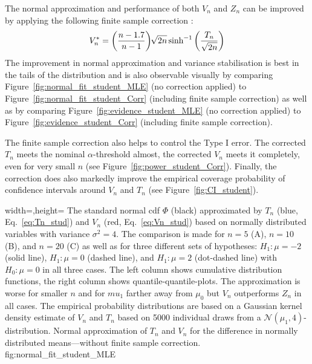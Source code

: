 The normal approximation and performance of both $V_n$ and $Z_n$ can be improved by applying the following finite sample correction \citep[p.~161]{kulinskaya_meta_2008}:
\begin{align}
    V_n^* = \left(\frac{n-1.7}{n-1}\right) \sqrt[]{2n}\,\text{sinh}^{-1}\left(\frac{T_n}{\sqrt{2n}}\right) \label{eq:finite_sample_correction}
\end{align} %
The improvement in normal approximation and variance stabilisation is best in the tails of the distribution and is also observable visually by comparing Figure~\ref{fig:normal_fit_student_MLE} (no correction applied) to Figure~\ref{fig:normal_fit_student_Corr} (including finite sample correction) as well as by comparing Figure~\ref{fig:evidence_student_MLE} (no correction applied) to Figure~\ref{fig:evidence_student_Corr} (including finite sample correction).\par
The finite sample correction also helps to control the Type I error. The corrected $T_n$ meets the nominal $\alpha$-threshold almost, the corrected $V_n$ meets it completely, even for very small $n$ (see Figure~\ref{fig:power_student_Corr}). Finally, the correction does also markedly improve the empirical coverage probability of confidence intervals around $V_n$ and $T_n$ (see Figure~\ref{fig:CI_student}).


  {width=\textwidth,height=\textheight}%
  {The standard normal cdf $\Phi$ (black) approximated by $T_n$ (blue, Eq.~\ref{eq:Tn_stud}) and $V_n$ (red, Eq.~\ref{eq:Vn_stud}) based on normally distributed variables with variance ${\sigma^2 = 4}$. The comparison is made for $n=5$ (A), $n=10$ (B), and $n=20$ (C) as well as for three different sets of hypotheses: ${H_1: \mu = -2}$ (solid line), ${H_1: \mu = 0}$ (dashed line), and ${H_1: \mu = 2}$ (dot-dashed line) with ${H_0: \mu=0}$ in all three cases. The left column shows cumulative distribution functions, the right column shows quantile-quantile-plots. The approximation is worse for smaller $n$ and for $mu_1$ farther away from $\mu_0$ but $V_n$ outperforms $Z_n$ in all cases. The empirical probability distributions are based on a Gaussian kernel density estimate of $V_n$ and $T_n$ based on 5000 individual draws from a $\mathcal{N}(\mu_1,4)$-distribution.}%
  {Normal approximation of $T_n$ and $V_n$ for the difference in normally distributed means---without finite sample correction.}%
  {fig:normal_fit_student_MLE}%

